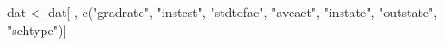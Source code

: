 \begin{Schunk}
\begin{Sinput}
 dat <- dat[ , c("gradrate", "instcst", "stdtofac", "aveact", "instate", "outstate", "schtype")]
\end{Sinput}
\end{Schunk}
